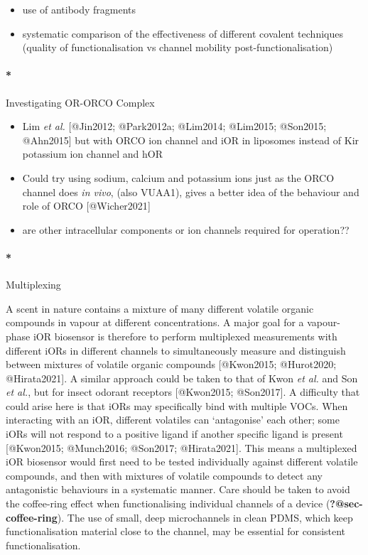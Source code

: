 \documentclass[
  letterpaper,
  DIV=11,
  numbers=noendperiod]{scrartcl}
\let\oldparagraph\paragraph
\renewcommand{\paragraph}[1]{\oldparagraph{#1}\mbox{}}
\begin{document}
\begin{itemize}
\item
  use of antibody fragments
\item
  systematic comparison of the effectiveness of different covalent
  techniques (quality of functionalisation vs channel mobility
  post-functionalisation)
\end{itemize}

\hypertarget{investigating-or-orco-complex}{%
\paragraph*{Investigating OR-ORCO
Complex}\label{investigating-or-orco-complex}}

\begin{itemize}
\item
  Lim \emph{et al.} {[}@Jin2012; @Park2012a; @Lim2014; @Lim2015;
  @Son2015; @Ahn2015{]} but with ORCO ion channel and iOR in liposomes
  instead of Kir potassium ion channel and hOR
\item
  Could try using sodium, calcium and potassium ions just as the ORCO
  channel does \emph{in vivo}, (also VUAA1), gives a better idea of the
  behaviour and role of ORCO {[}@Wicher2021{]}
\item
  are other intracellular components or ion channels required for
  operation??
\end{itemize}

\hypertarget{multiplexing}{%
\paragraph*{Multiplexing}\label{multiplexing}}

A scent in nature contains a mixture of many different volatile organic
compounds in vapour at different concentrations. A major goal for a
vapour-phase iOR biosensor is therefore to perform multiplexed
measurements with different iORs in different channels to simultaneously
measure and distinguish between mixtures of volatile organic compounds
{[}@Kwon2015; @Hurot2020; @Hirata2021{]}. A similar approach could be
taken to that of Kwon \emph{et al.} and Son \emph{et al.}, but for
insect odorant receptors {[}@Kwon2015; @Son2017{]}. A difficulty that
could arise here is that iORs may specifically bind with multiple VOCs.
When interacting with an iOR, different volatiles can `antagonise' each
other; some iORs will not respond to a positive ligand if another
specific ligand is present {[}@Kwon2015; @Munch2016; @Son2017;
@Hirata2021{]}. This means a multiplexed iOR biosensor would first need
to be tested individually against different volatile compounds, and then
with mixtures of volatile compounds to detect any antagonistic
behaviours in a systematic manner. Care should be taken to avoid the
coffee-ring effect when functionalising individual channels of a device
(\textbf{?@sec-coffee-ring}). The use of small, deep microchannels in
clean PDMS, which keep functionalisation material close to the channel,
may be essential for consistent functionalisation.
\end{document}
